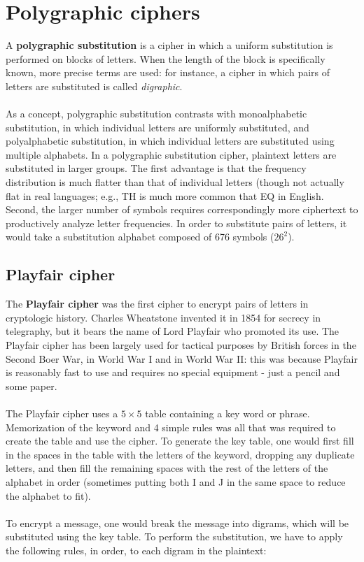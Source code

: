 \documentclass[Lau,binding=0.6cm,oneside]{sapthesis}
\begin{document}
\section{Polygraphic ciphers}
A \textbf{polygraphic substitution} is a cipher in which a uniform substitution is performed on blocks of letters. When the length of the block is specifically known, more precise terms are used: for instance, a cipher in which pairs of letters are substituted is called \textit{digraphic}.\\\\
As a concept, polygraphic substitution contrasts with monoalphabetic substitution, in which individual letters are uniformly substituted, and polyalphabetic substitution, in which individual letters are substituted using multiple alphabets. In a polygraphic substitution cipher, plaintext letters are substituted in larger groups. The first advantage is that the frequency distribution is much flatter than that of individual letters (though not actually flat in real languages; e.g., \textsf{TH} is much more common that \textsf{EQ} in English. Second, the larger number of symbols requires correspondingly more ciphertext to productively analyze letter frequencies. In order to substitute pairs of letters, it would take a substitution alphabet composed of 676 symbols ($26^{2}$).

\subsection{Playfair cipher}
The \textbf{Playfair cipher} was the first cipher to encrypt pairs of letters in cryptologic history. Charles Wheatstone invented it in 1854 for secrecy in telegraphy, but it bears the name of Lord Playfair who promoted its use\supercite{playfair}. The Playfair cipher has been largely used for tactical purposes by British forces in the Second Boer War, in World War I and in World War II: this was because Playfair is reasonably fast to use and requires no special equipment - just a pencil and some paper.\\\\
The Playfair cipher uses a $5 \times 5$ table containing a key word or phrase. Memorization of the keyword and 4 simple rules was all that was required to create the table and use the cipher. To generate the key table, one would first fill in the spaces in the table with the letters of the keyword, dropping any duplicate letters, and then fill the remaining spaces with the rest of the letters of the alphabet in order (sometimes putting both \textsf{I} and \textsf{J} in the same space to reduce the alphabet to fit).\\\\
To encrypt a message, one would break the message into digrams, which will be substituted using the key table. To perform the substitution, we have to apply the following rules, in order, to each digram in the plaintext:
\end{document}
